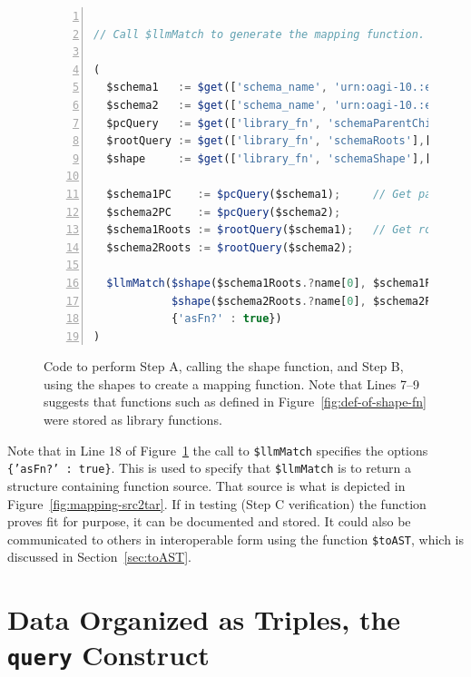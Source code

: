 \documentclass[10pt,letterpaper]{article} %
\newcommand{\stt}[1]{\texttt{#1}} %
\begin{document}
\begin{figure}[H]
  \caption{Code to perform Step A, calling the shape function, and Step B, using the shapes to create a mapping function.
  Note that Lines 7--9 suggests that functions such as defined in Figure~\ref{fig:def-of-shape-fn} were stored as library functions.}
  \label{fig:call-to-shape}
\begin{lstlisting}[language=JavaScript,numberstyle=\scriptsize,basicstyle=\ttfamily\scriptsize,numbers=left,stepnumber=1,breaklines=true]

// Call $llmMatch to generate the mapping function. Note use of {'asFn?' true} in the call.

(
  $schema1   := $get(['schema_name', 'urn:oagi-10.:elena.2023-07-02.ProcessInvoice-BC_1_v2'], ['schema_content']);
  $schema2   := $get(['schema_name', 'urn:oagi-10.:elena.2023-07-02.ProcessInvoice-BC_2_v2'], ['schema_content']);
  $pcQuery   := $get(['library_fn', 'schemaParentChild'],['fn_exe']).fn_exe;
  $rootQuery := $get(['library_fn', 'schemaRoots'],['fn_exe']).fn_exe;
  $shape     := $get(['library_fn', 'schemaShape'],['fn_exe']).fn_exe;

  $schema1PC    := $pcQuery($schema1);     // Get parent-child relationships of each schema.
  $schema2PC    := $pcQuery($schema2);
  $schema1Roots := $rootQuery($schema1);   // Get root elements of each schema.
  $schema2Roots := $rootQuery($schema2);

  $llmMatch($shape($schema1Roots.?name[0], $schema1PC), // [0] is cheating a bit; there could be multiple roots.
            $shape($schema2Roots.?name[0], $schema2PC), // Call $llmMatch to do shape matching
            {'asFn?' : true})
)
\end{lstlisting}
\end{figure} \vspace{-3em}

Note that in Line 18 of Figure~\ref{fig:call-to-shape} the call to \stt{\$llmMatch} specifies the options \stt{\{'asFn?' : true\}}. This is used to specify that \stt{\$llmMatch} is to return a structure containing function source.
That source is what is depicted in Figure~\ref{fig:mapping-src2tar}.
If in testing (Step C verification) the function proves fit for purpose, it can be documented and stored.
It could also be communicated to others in interoperable form using the function \stt{\$toAST}, which is discussed in Section~\ref{sec:toAST}.

\section{Data Organized as Triples,  the \stt{query} Construct}
\label{sec:query}
\end{document}
